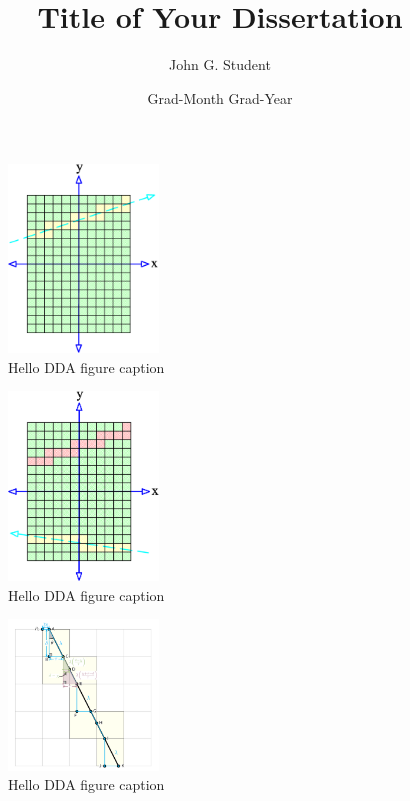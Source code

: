 \documentclass{thesis}
\title{Title of Your Dissertation}                                      %
\author{John G. Student}                                                %
\date{Grad-Month Grad-Year}                                             %
\begin{document}
	

	\begin{figure}
	  \centering
	  \includegraphics[width=4cm]{Space_Carving_1.png}
	  \caption{Hello DDA figure caption }\label{fig:DDA}
	\end{figure}
	\begin{figure}
	  \centering
	  \includegraphics[width=4cm]{Space_Carving_2.png}
	  \caption{Hello DDA figure caption}\label{fig:DDA}
	\end{figure}

	\begin{figure}
	  \centering
	  \includegraphics[width=4cm]{DDA.png}
	  \caption{Hello DDA figure caption}\label{fig:DDA}
	\end{figure}



\end{document}
